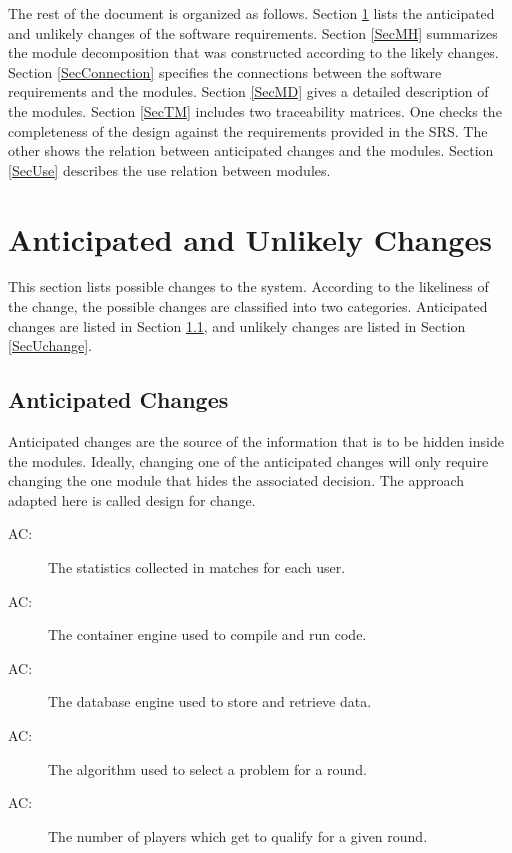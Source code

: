 \documentclass[12pt, titlepage]{article}
\newcounter{acnum}
\newcommand{\actheacnum}{AC\theacnum}
\begin{document}
The rest of the document is organized as follows. Section
\ref{SecChange} lists the anticipated and unlikely changes of the software
requirements. Section \ref{SecMH} summarizes the module decomposition that
was constructed according to the likely changes. Section \ref{SecConnection}
specifies the connections between the software requirements and the
modules. Section \ref{SecMD} gives a detailed description of the
modules. Section \ref{SecTM} includes two traceability matrices. One checks
the completeness of the design against the requirements provided in the SRS. The
other shows the relation between anticipated changes and the modules. Section
\ref{SecUse} describes the use relation between modules.

\section{Anticipated and Unlikely Changes} \label{SecChange}

This section lists possible changes to the system. According to the likeliness
of the change, the possible changes are classified into two
categories. Anticipated changes are listed in Section \ref{SecAchange}, and
unlikely changes are listed in Section \ref{SecUchange}.

\subsection{Anticipated Changes} \label{SecAchange}

Anticipated changes are the source of the information that is to be hidden
inside the modules. Ideally, changing one of the anticipated changes will only
require changing the one module that hides the associated decision. The approach
adapted here is called design for
change.

\begin{description}
\item[ \actheacnum \label{acStats}:] The statistics collected in matches for each user.
\item[ \actheacnum \label{acDocker}:] The container engine used to compile and run code.
\item[ \actheacnum \label{acDb}:] The database engine used to store and retrieve data.
\item[ \actheacnum \label{acSelection}:] The algorithm used to select a problem for a round. 
\item[ \actheacnum \label{acRounds}:] The number of players which get to qualify for a given round.

\end{description}
\end{document}
